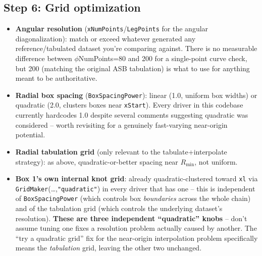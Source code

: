 \documentclass[11pt]{article}
\newcommand{\sub}[1]{\texttt{#1}}
\begin{document}
\subsection*{Step 6: Grid optimization}
\begin{itemize}
\item \textbf{Angular resolution} (\texttt{xNumPoints}/\texttt{LegPoints} for the angular
  diagonalization): match or exceed whatever generated any reference/tabulated dataset you're
  comparing against. There is no measurable difference between $\phi$NumPoints=80 and 200 for a
  single-point curve check, but 200 (matching the original ASB tabulation) is what to use for
  anything meant to be authoritative.
\item \textbf{Radial box spacing} (\texttt{BoxSpacingPower}): linear (1.0, uniform box widths) or
  quadratic (2.0, clusters boxes near \texttt{xStart}). Every driver in this codebase currently
  hardcodes 1.0 despite several comments suggesting quadratic was considered -- worth revisiting
  for a genuinely fast-varying near-origin potential.
\item \textbf{Radial tabulation grid} (only relevant to the tabulate+interpolate strategy): as
  above, quadratic-or-better spacing near $R_{\min}$, not uniform.
\item \textbf{Box 1's own internal knot grid}: already quadratic-clustered toward \texttt{xl} via
  \sub{GridMaker}(\ldots,\texttt{"quadratic"}) in every driver that has one -- this is independent
  of \texttt{BoxSpacingPower} (which controls box \emph{boundaries} across the whole chain) and of
  the tabulation grid (which controls the underlying dataset's resolution). \textbf{These are three
  independent ``quadratic'' knobs} -- don't assume tuning one fixes a resolution problem actually
  caused by another. The ``try a quadratic grid'' fix for the near-origin interpolation problem
  specifically means the \emph{tabulation} grid, leaving the other two unchanged.
\end{itemize}
\end{document}
